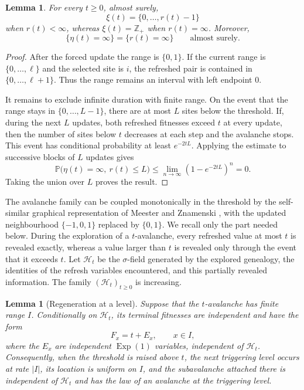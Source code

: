 \documentclass[11pt,a4paper]{amsart}
\newtheorem{lemma}[theorem]{Lemma}
\theoremstyle{remark}
\begin{document}
\begin{lemma}
\label{lem:range-interval}
For every $t\geq0$, almost surely,
\[
        \xi(t)=\{0,\ldots,r(t)-1\}
\]
when $r(t)<\infty$, whereas $\xi(t)=\mathbb Z_+$ when $r(t)=\infty$.
Moreover,
\[
        \{\eta(t)=\infty\}=\{r(t)=\infty\}
        \qquad\text{almost surely}.
\]
\end{lemma}

\begin{proof}
After the forced update the range is $\{0,1\}$. If the current range is
$\{0,\ldots,\ell\}$ and the selected site is $i$, the refreshed pair is
contained in $\{0,\ldots,\ell+1\}$. Thus the range remains an interval
with left endpoint $0$.

It remains to exclude infinite duration with finite range. On the event
that the range stays in $\{0,\ldots,L-1\}$, there are at most $L$ sites
below the threshold. If, during the next $L$ updates, both refreshed
fitnesses exceed $t$ at every update, then the number of sites below $t$
decreases at each step and the avalanche stops. This event has conditional
probability at least $e^{-2tL}$. Applying the estimate to successive
blocks of $L$ updates gives
\[
        \mathbb P\bigl(\eta(t)=\infty,\ r(t)\leq L\bigr)
        \leq\lim_{n\to\infty}(1-e^{-2tL})^n=0.
\]
Taking the union over $L$ proves the result.
\end{proof}




The avalanche family can be coupled monotonically in the threshold by the
self-similar graphical representation of Meester and Znamenski
\cite[Section~4]{MZ04}, with the updated neighbourhood
$\{-1,0,1\}$ replaced by $\{0,1\}$. We recall only the part needed below.
During the exploration of a $t$-avalanche, every refreshed value at most
$t$ is revealed exactly, whereas a value larger than $t$ is revealed only
through the event that it exceeds $t$. Let $\mathcal H_t$ be the
$\sigma$-field generated by the explored genealogy, the identities of the
refresh variables encountered, and this partially revealed information.
The family $(\mathcal H_t)_{t\geq0}$ is increasing.

\begin{lemma}[Regeneration at a level]
\label{lem:level-regeneration}
Suppose that the $t$-avalanche has finite range $I$. Conditionally on
$\mathcal H_t$, its terminal fitnesses are independent and have the form
\[
        F_x=t+E_x,\qquad x\in I,
\]
where the $E_x$ are independent $\operatorname{Exp}(1)$ variables,
independent of $\mathcal H_t$. Consequently, when the threshold is raised
above $t$, the next triggering level occurs at rate $|I|$, its location is
uniform on $I$, and the subavalanche attached there is independent of
$\mathcal H_t$ and has the law of an avalanche at the triggering level.
\end{lemma}
\end{document}
